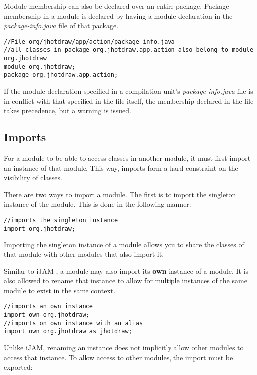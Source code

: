 Module membership can also be declared over an entire package. Package membership in a module 
is declared by having a module declaration
in the \textit{package-info.java} file of that package.

\begin{lstlisting}
//File org/jhotdraw/app/action/package-info.java
//all classes in package org.jhotdraw.app.action also belong to module org.jhotdraw
module org.jhotdraw;
package org.jhotdraw.app.action;
\end{lstlisting}

If the module declaration specified in a compilation unit's \textit{package-info.java}
file is in conflict with that specified in the file itself, the membership
declared in the file takes precedence, but a warning is issued.

\subsection{Imports}

For a module to be able to access classes in another module,
it must first import an instance of that module. This way, imports form
a hard constraint on the visibility of classes.

There are two ways to import a module. The first is to import the singleton
instance of the module. This is done in the following manner:

\begin{lstlisting}
//imports the singleton instance
import org.jhotdraw;
\end{lstlisting}

Importing the singleton instance of a module allows you to share the classes
of that module with other modules that also import it.

Similar to iJAM \cite{iJAM}, a module may also import its \textbf{own} instance of
a module. It is also allowed to rename that instance to allow for multiple
instances of the same module to exist in the same context.

\begin{lstlisting}
//imports an own instance
import own org.jhotdraw;
//imports on own instance with an alias
import own org.jhotdraw as jhotdraw;
\end{lstlisting}

Unlike iJAM, renaming an instance does not implicitly allow other
modules to access that instance. To allow access to other modules, the import
must be exported:

